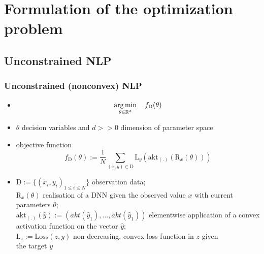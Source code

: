 



\beamertemplatenavigationsymbolsempty{}




\section{Formulation of the optimization problem}

   \subsection{Unconstrained NLP}
   
   \begin{frame}
   \frametitle{Unconstrained (nonconvex) NLP}
   \begin{itemize}
   	\item[] $$\operatorname*{arg\,min}_{\theta\in\mathbb{R}^{d}}\quad f_{\mathrm{D}}(\theta)$$
   	\pause
   	\item $\theta$ decision variables and $d>>0$ dimension of parameter space
    \pause
   	\item objective function
   	$$f_{\mathrm{D}}(\theta) := \frac{1}{N}\sum_{(x, y)\in\mathrm{D}}^{}\mathrm{L}_{y}(\text{akt}_{(.)}(\mathrm{R}_{x}(\theta)))$$
   	\pause
   	\item $\mathrm{D} := \{(x_{i}, y_{i})_{1\leq i\leq N}\}$ observation data;\\ 
   	$\mathrm{R}_{x}(\theta)$ realisation of a DNN given the observed value $x$ with current parameters $\theta$;\\
   	$\text{akt}_{(.)}(\hat{y}) := \left(akt(\hat{y}_{1}), \ldots, akt(\hat{y}_{1})\right)$ elementwise application of a convex activation function on the vector $\hat{y}$;\\
   	$\mathrm{L}_{z} := \text{Loss}(z, y)$ non-decreasing, convex loss function in $z$ given \\ the target $y$
   \end{itemize}
  \end{frame}
   
